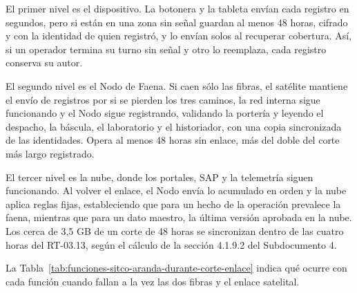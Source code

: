 \documentclass[subdoc]{../../comun/overfore}
\begin{document}
\begin{horizontal}
\end{horizontal}
El primer nivel es el dispositivo. La botonera y la tableta envían cada registro en segundos, pero si están en una zona sin señal guardan al menos 48 horas, cifrado y con la identidad de quien registró, y lo envían solos al recuperar cobertura. Así, si un operador termina su turno sin señal y otro lo reemplaza, cada registro conserva su autor.

El segundo nivel es el Nodo de Faena. Si caen sólo las fibras, el satélite mantiene el envío de registros por si se pierden los tres caminos, la red interna sigue funcionando y el Nodo sigue registrando, validando la portería y leyendo el despacho, la báscula, el laboratorio y el historiador, con una copia sincronizada de las identidades. Opera al menos 48 horas sin enlace, más del doble del corte más largo registrado.

El tercer nivel es la nube, donde los portales, SAP y la telemetría siguen funcionando. Al volver el enlace, el Nodo envía lo acumulado en orden y la nube aplica reglas fijas, estableciendo que para un hecho de la operación prevalece la faena, mientras que para un dato maestro, la última versión aprobada en la nube. Los cerca de 3,5 GB de un corte de 48 horas se sincronizan dentro de las cuatro horas del RT-03.13, según el cálculo de la sección 4.1.9.2 del Subdocumento 4.

La Tabla~\ref{tab:funciones-sitco-aranda-durante-corte-enlace} indica qué ocurre con cada función cuando fallan a la vez las dos fibras y el enlace satelital.
\end{document}
